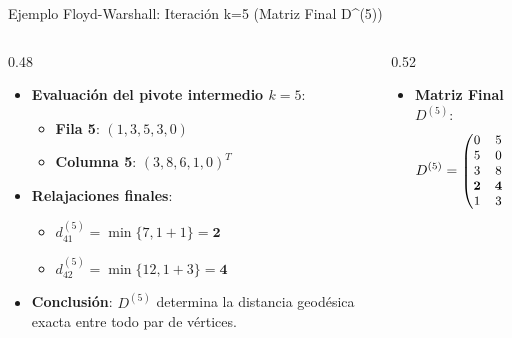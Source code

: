 \documentclass[
  ignorenonframetext,
]{beamer}
\providecommand{\tightlist}{%
  \setlength{\itemsep}{0pt}\setlength{\parskip}{0pt}}
\begin{document}
\begin{frame}{Ejemplo Floyd-Warshall: Iteración k=5 (Matriz Final
D\^{}(5))}
\label{ejemplo-floyd-warshall-iteraciuxf3n-k5-matriz-final-d5}
\begin{columns}[T]
\begin{column}{0.48\linewidth}
\begin{itemize}
\tightlist
\item
  \textbf{Evaluación del pivote intermedio \(k=5\)}:

  \begin{itemize}
  \tightlist
  \item
    \textbf{Fila 5}: \((1, 3, 5, 3, 0)\)
  \item
    \textbf{Columna 5}: \((3, 8, 6, 1, 0)^T\)
  \end{itemize}
\item
  \textbf{Relajaciones finales}:

  \begin{itemize}
  \tightlist
  \item
    \(d_{41}^{(5)} = \min \{7, 1 + 1\} = \mathbf{2}\)
  \item
    \(d_{42}^{(5)} = \min \{12, 1 + 3\} = \mathbf{4}\)
  \end{itemize}
\item
  \textbf{Conclusión}: \(D^{(5)}\) determina la distancia geodésica
  exacta entre todo par de vértices.
\end{itemize}
\end{column}

\begin{column}{0.52\linewidth}
\begin{itemize}
\tightlist
\item
  \textbf{Matriz Final \(D^{(5)}\)}: \[ \small
  D^{(5)} = \begin{pmatrix}
  0 & 5 & 6 & 2 & 3 \\
  5 & 0 & 2 & 7 & 8 \\
  3 & 8 & 0 & 5 & 6 \\
  \mathbf{2} & \mathbf{4} & 4 & 0 & 1 \\
  1 & 3 & 5 & 3 & 0
  \end{pmatrix}
  \]
\end{itemize}
\end{column}
\end{columns}
\end{frame}
\end{document}
